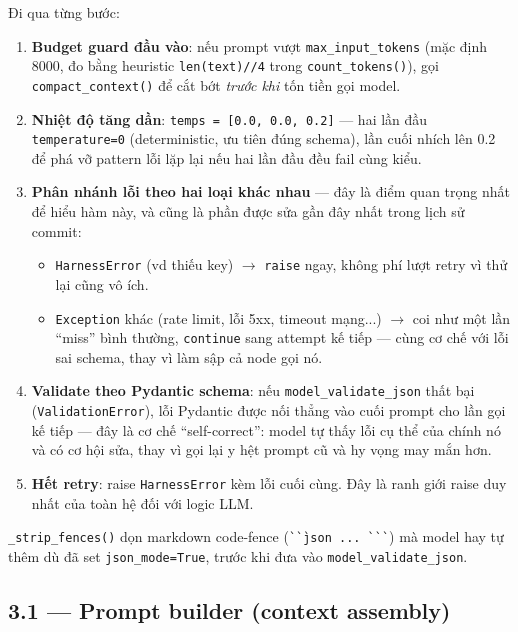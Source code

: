 \documentclass[12pt,a4paper]{article}
\begin{document}
Đi qua từng bước:
\begin{enumerate}[leftmargin=1.6em]
    \item \textbf{Budget guard đầu vào}: nếu prompt vượt \texttt{max\_input\_tokens} (mặc định
    8000, đo bằng heuristic \texttt{len(text)//4} trong \texttt{count\_tokens()}), gọi
    \texttt{compact\_context()} để cắt bớt \emph{trước khi} tốn tiền gọi model.
    \item \textbf{Nhiệt độ tăng dần}: \texttt{temps = [0.0, 0.0, 0.2]} --- hai lần đầu
    \texttt{temperature=0} (deterministic, ưu tiên đúng schema), lần cuối nhích lên 0.2 để phá vỡ
    pattern lỗi lặp lại nếu hai lần đầu đều fail cùng kiểu.
    \item \textbf{Phân nhánh lỗi theo hai loại khác nhau} --- đây là điểm quan trọng nhất để hiểu
    hàm này, và cũng là phần được sửa gần đây nhất trong lịch sử commit:
    \begin{itemize}
        \item \texttt{HarnessError} (vd thiếu key) $\to$ \texttt{raise} ngay, không phí lượt retry
        vì thử lại cũng vô ích.
        \item \texttt{Exception} khác (rate limit, lỗi 5xx, timeout mạng...) $\to$ coi như một
        lần ``miss'' bình thường, \texttt{continue} sang attempt kế tiếp --- cùng cơ chế với lỗi
        sai schema, thay vì làm sập cả node gọi nó.
    \end{itemize}
    \item \textbf{Validate theo Pydantic schema}: nếu \texttt{model\_validate\_json} thất bại
    (\texttt{ValidationError}), lỗi Pydantic được nối thẳng vào cuối prompt cho lần gọi kế tiếp
    --- đây là cơ chế ``self-correct'': model tự thấy lỗi cụ thể của chính nó và có cơ hội sửa,
    thay vì gọi lại y hệt prompt cũ và hy vọng may mắn hơn.
    \item \textbf{Hết retry}: raise \texttt{HarnessError} kèm lỗi cuối cùng. Đây là ranh giới
    raise duy nhất của toàn hệ đối với logic LLM.
\end{enumerate}

\texttt{\_strip\_fences()} dọn markdown code-fence (\texttt{\`{}\`{}\`json ... \`{}\`{}\`}) mà
model hay tự thêm dù đã set \texttt{json\_mode=True}, trước khi đưa vào
\texttt{model\_validate\_json}.

\subsection{3.1 --- Prompt builder (context assembly)}
\end{document}
